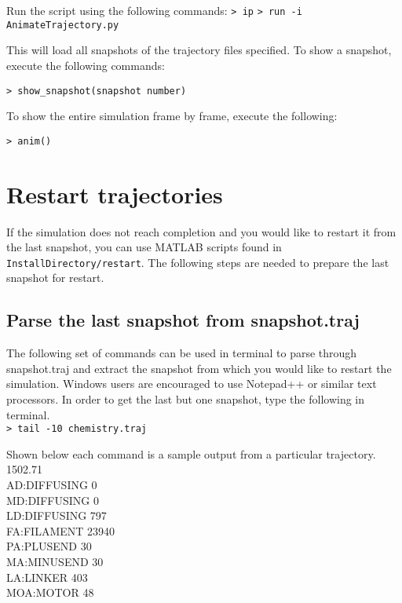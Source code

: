 \documentclass[11pt, oneside]{article}   	%
\begin{document}
\noindent Run the script using the following commands:\newline\newline
\indent\texttt{> ip}\newline
\indent\texttt{> run -i AnimateTrajectory.py}\newline

\noindent This will load all snapshots of the trajectory files specified. To show a snapshot, execute the following commands:\newline

\texttt{> show\_snapshot(snapshot number)}\newline

\noindent To show the entire simulation frame by frame, execute the following:\newline

\texttt{> anim()}

\section{Restart trajectories}
If the simulation does not reach completion and you would like to restart it from the last snapshot, you can use MATLAB scripts found in \texttt{InstallDirectory/restart}. The following steps are needed to prepare the last snapshot for restart.
\subsection{Parse the last snapshot from snapshot.traj}
The following set of commands can be used in terminal to parse through snapshot.traj and extract the snapshot from which you would like to restart the simulation. Windows users are encouraged to use Notepad++ or similar text processors. 
In order to get the last but one snapshot, type the following in terminal. \\ \newline
\texttt{> tail -10 chemistry.traj} \newline

Shown below each command is a sample output from a particular trajectory. \\
 1502.71 \\
\indent AD:DIFFUSING 0\\
\indent MD:DIFFUSING 0\\
\indent LD:DIFFUSING 797\\
\indent FA:FILAMENT 23940\\
\indent PA:PLUSEND 30\\
\indent MA:MINUSEND 30\\
\indent LA:LINKER 403\\
\indent MOA:MOTOR 48\\
\end{document}
